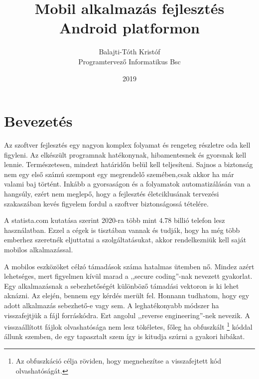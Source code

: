 \documentclass{thesis-ekf}             %
\theoremstyle{definition}
\theoremstyle{remark}
\begin{document}
\title{Mobil alkalmazás fejlesztés\\Android platformon}
\author{Balajti-Tóth Kristóf\\Programtervező Informatikus Bsc}
\date{2019}
\maketitle
\tableofcontents

\chapter*{Bevezetés}
Az szoftver fejlesztés egy nagyon komplex folyamat és rengeteg részletre oda kell figyleni. Az elkészült programnak hatékonynak, hibamentesnek és gyorsnak kell lennie. Természetesen, mindezt határidőn belül kell teljesíteni. Sajnos a biztonság nem egy első számú szempont egy megrendelő szemében,csak akkor ha már valami baj történt. Inkább a gyorsaságon és a folyamatok automatizálásán van a hangsúly, ezért nem  meglepő, hogy a fejlesztés életciklusának tervezési szakaszában kevés figyelem fordul a szoftver biztonságossá tételére.

A statista.com \cite{statista} kutatása szerint 2020-ra több mint 4.78 billió telefon lesz használatban. Ezzel a cégek is tisztában vannak és tudják, hogy ha még több emberhez szeretnék eljuttatni a szolgáltatásukat, akkor rendelkezniük kell saját mobilos alkalmazással.

A mobilos eszközöket célzó támadások száma hatalmas ütemben nő. Mindez azért lehetséges, mert figyelmen kívül marad a ,,secure coding''-nak nevezett gyakorlat. Egy alkalmazásnak a sebezhetőségét különböző támadási vektoron is ki lehet aknázni. Az elején, bennem egy kérdés merült fel. Honnann tudhatom, hogy egy adott alkalmazás sebezhető-e vagy sem. A leghatékonyabb módszer ha visszafejtjük a fájl forráskódra. Ezt angolul ,,reverse engineering''-nek nevezik. A visszaállított fájlok olvashatósága nem lesz tökéletes, főleg ha obfuszkált \footnote{Az obfuszkáció célja röviden, hogy megnehezítse a visszafejtett kód olvashatóságát.} kóddal állunk szemben, de egy tapasztalt szem így is kitudja szúrni a gyakori hibákat.
\end{document}
